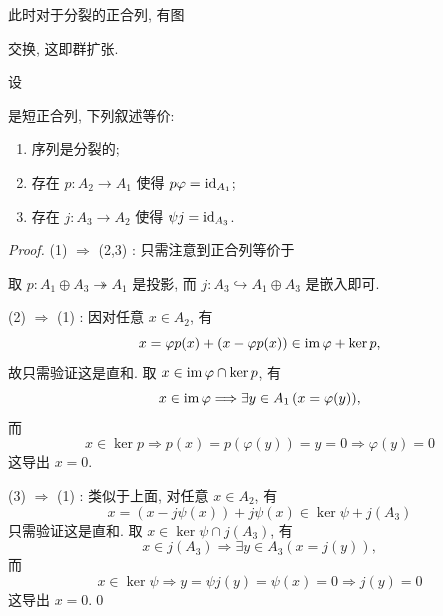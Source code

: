 此时对于分裂的正合列, 有图
\begin{center}
\end{center}
交换, 这即群扩张.

\begin{Proposition}[分裂正合列的判定]
	设
	\begin{center}
	\end{center}
	是短正合列, 下列叙述等价:
	\begin{enumerate}[(1)]
		\item 序列是分裂的;
		\item 存在 $ p : A_2\to A_1 $ 使得 $ p\varphi=\mathrm{id}_{A_1} $;
		\item 存在 $ j : A_3\to A_2 $ 使得 $ \psi j=\mathrm{id}_{A_3} $.
	\end{enumerate}
\end{Proposition}
\begin{proof}
	(1) $ \Rightarrow $ (2,3) : 只需注意到正合列等价于
	\begin{center}
	\end{center}
	取 $ p : A_1\oplus A_3\twoheadrightarrow A_1 $ 是投影, 而 $ j : A_3\hookrightarrow A_1\oplus A_3 $ 是嵌入即可.

	(2) $ \Rightarrow $ (1) : 因对任意 $ x\in A_2 $, 有
	\[
		x=\varphi p(x)+(x-\varphi p(x))\in\mathrm{im}\,\varphi+\ker p,
	\]
	故只需验证这是直和. 取 $ x\in\mathrm{im}\,\varphi\cap\ker p $, 有
	\[
		x\in\mathrm{im}\,\varphi\Longrightarrow\exists y\in A_1\,(x=\varphi(y)),
	\]
	而
	\[
		x\in\ker p\Longrightarrow p(x)=p(\varphi(y))=y=0\Longrightarrow\varphi(y)=0
	\]
	这导出 $ x=0 $.

	(3) $ \Rightarrow $ (1) : 类似于上面, 对任意 $ x\in A_2 $, 有
	\[
		x=(x-j\psi(x))+j\psi(x)\in\ker\psi+j(A_3)
	\]
	只需验证这是直和. 取 $ x\in\ker\psi\cap j(A_3) $, 有
	\[
		x\in j(A_3)\Longrightarrow\exists y\in A_3(x=j(y)),
	\]
	而
	\[
		x\in\ker\psi\Longrightarrow y=\psi j(y)=\psi(x)=0\Longrightarrow j(y)=0
	\]
	这导出 $ x=0 $.\qed
\end{proof}

